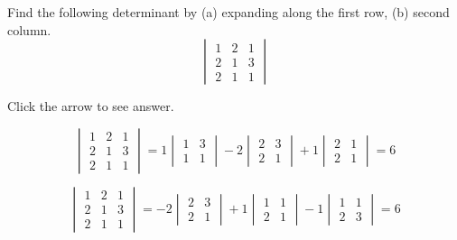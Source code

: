 \documentclass{ximera}
\begin{document}
\begin{problem}\label{prb:7.4} Find the following determinant by (a) expanding along the first row, (b)
second column.
$$\begin{vmatrix}
1 & 2 & 1 \\
2 & 1 & 3 \\
2 & 1 & 1
\end{vmatrix}$$

Click the arrow to see answer.
\begin{expandable}{}{}

$$\begin{vmatrix}
1 & 2 & 1 \\
2 & 1 & 3 \\
2 & 1 & 1
\end{vmatrix}=1\begin{vmatrix}1 & 3 \\1 & 1\end{vmatrix}-2\begin{vmatrix}2 & 3\\2 & 1\end{vmatrix}+1\begin{vmatrix}2 & 1\\2 & 1\end{vmatrix}=6$$

$$\begin{vmatrix}
1 & 2 & 1 \\
2 & 1 & 3 \\
2 & 1 & 1
\end{vmatrix}=-2\begin{vmatrix}2 & 3 \\2 & 1\end{vmatrix}+1\begin{vmatrix}1 & 1\\2 & 1\end{vmatrix}-1\begin{vmatrix}1 & 1\\2 & 3\end{vmatrix}=6$$

\end{expandable}
\end{problem}
\end{document}
